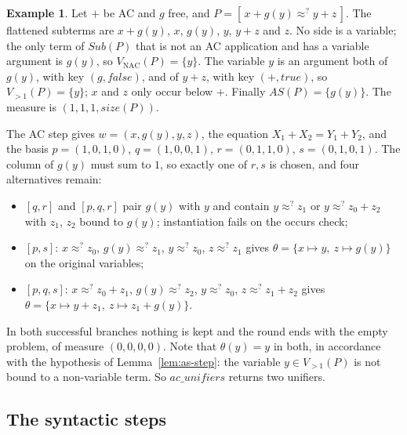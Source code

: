 \documentclass[11pt,a4paper]{article}
\theoremstyle{definition}
\newtheorem{example}[theorem]{Example}
\theoremstyle{remark}
\newcommand{\Sub}{\mathit{Sub}}
\newcommand{\VNAC}{V_{\mathrm{NAC}}}
\newcommand{\Vtwo}{V_{>1}}
\newcommand{\AS}{\mathit{AS}}
\newcommand{\psize}{\mathit{size}}
\begin{document}
\begin{example}\label{ex:measure}
  Let $+$ be AC and $g$ free, and $P = [\,x + g(y) \approx^? y + z\,]$. The flattened subterms
  are $x + g(y)$, $x$, $g(y)$, $y$, $y + z$ and $z$. No side is a variable; the only term of
  $\Sub(P)$ that is not an AC application and has a variable argument is $g(y)$, so
  $\VNAC(P) = \{y\}$. The variable $y$ is an argument both of $g(y)$, with key $(g,
  \mathit{false})$, and of $y + z$, with key $(+, \mathit{true})$, so $\Vtwo(P) = \{y\}$; $x$ and
  $z$ only occur below $+$. Finally $\AS(P) = \{g(y)\}$. The measure is $(1, 1, 1, \psize(P))$.

  The AC step gives $w = (x, g(y), y, z)$, the equation $X_1 + X_2 = Y_1 + Y_2$, and the basis
  $p = (1,0,1,0)$, $q = (1,0,0,1)$, $r = (0,1,1,0)$, $s = (0,1,0,1)$. The column of $g(y)$ must
  sum to $1$, so exactly one of $r, s$ is chosen, and four alternatives remain:
  \begin{itemize}[nosep,leftmargin=*]
    \item $[q, r]$ and $[p, q, r]$ pair $g(y)$ with $y$ and contain $y \approx^? z_1$ or
          $y \approx^? z_0 + z_2$ with $z_1$, $z_2$ bound to $g(y)$; instantiation fails on the
          occurs check;
    \item $[p, s]$: $x \approx^? z_0$, $g(y) \approx^? z_1$, $y \approx^? z_0$, $z \approx^? z_1$
          gives $\theta = \{x \mapsto y,\ z \mapsto g(y)\}$ on the original variables;
    \item $[p, q, s]$: $x \approx^? z_0 + z_1$, $g(y) \approx^? z_2$, $y \approx^? z_0$,
          $z \approx^? z_1 + z_2$ gives $\theta = \{x \mapsto y + z_1,\ z \mapsto z_1 + g(y)\}$.
  \end{itemize}
  In both successful branches nothing is kept and the round ends with the empty problem, of
  measure $(0,0,0,0)$. Note that $\theta(y) = y$ in both, in accordance with the hypothesis
  of Lemma~\ref{lem:as-step}: the variable $y \in \Vtwo(P)$ is not bound to a non-variable
  term. So $\mathit{ac\_unifiers}$ returns two unifiers.
\end{example}

\subsection{The syntactic steps}
\end{document}
